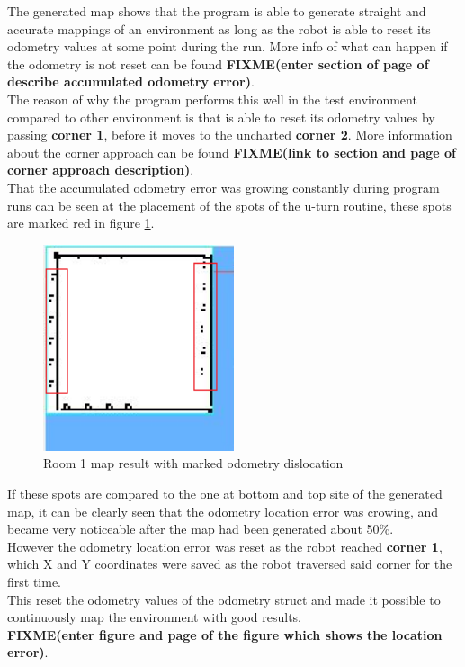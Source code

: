 The generated map shows that the program is able to generate straight and accurate mappings of an environment as long as the robot is able to reset its odometry values at some point during the run. More info of what can happen if the odometry is not reset can be found \textbf{FIXME(enter section of page of describe accumulated odometry error)}. \\
The reason of why the program performs this well in the test environment compared to other environment is that is able to reset its odometry values by passing \textbf{corner 1}, before it moves to the uncharted \textbf{corner 2}. More information about the corner approach can be found \textbf{FIXME(link to section and page of corner approach description)}. \\
That the accumulated odometry error was growing constantly during program runs can be seen at the placement of the spots of the u-turn routine, these spots are marked red in figure \ref{room1_empty_marked}.

\begin{figure}[h]
\centering
\includegraphics[width = 0.5\textwidth]{../../figures/room1_result_marked.png}
\caption{Room 1 map result with marked odometry dislocation}
\label{room1_empty_marked}
\end{figure}

If these spots are compared to the one at bottom and top site of the generated map, it can be clearly seen that the odometry location error was crowing, and became very noticeable after the map had been generated about 50\%.\\[3ex]

However the odometry location error was reset as the robot reached \textbf{corner 1}, which X and Y coordinates were saved as the robot traversed said corner for the first time. \\
This reset the odometry values of the odometry struct and made it possible to continuously map the environment with good results. \\
\textbf{FIXME(enter figure and page of the figure which shows  the location error)}.\\[3ex]

